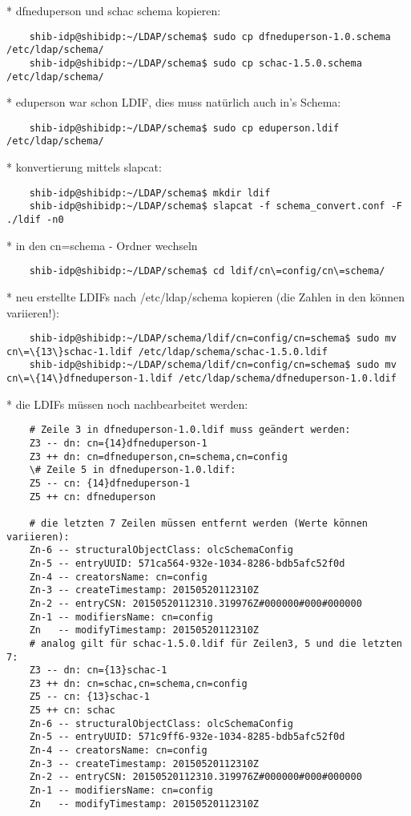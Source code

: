 * dfneduperson und schac schema kopieren:
\begin{lstlisting}
	shib-idp@shibidp:~/LDAP/schema$ sudo cp dfneduperson-1.0.schema /etc/ldap/schema/
	shib-idp@shibidp:~/LDAP/schema$ sudo cp schac-1.5.0.schema /etc/ldap/schema/
\end{lstlisting}
* eduperson war schon LDIF, dies muss natürlich auch in's Schema:
\begin{lstlisting}
	shib-idp@shibidp:~/LDAP/schema$ sudo cp eduperson.ldif /etc/ldap/schema/
\end{lstlisting}
* konvertierung mittels slapcat:
\begin{lstlisting}
	shib-idp@shibidp:~/LDAP/schema$ mkdir ldif
	shib-idp@shibidp:~/LDAP/schema$ slapcat -f schema_convert.conf -F ./ldif -n0
\end{lstlisting}
* in den cn=schema - Ordner wechseln
\begin{lstlisting}
	shib-idp@shibidp:~/LDAP/schema$ cd ldif/cn\=config/cn\=schema/
\end{lstlisting}
* neu erstellte LDIFs nach /etc/ldap/schema kopieren (die Zahlen in den {} können variieren!):
\begin{lstlisting}
	shib-idp@shibidp:~/LDAP/schema/ldif/cn=config/cn=schema$ sudo mv cn\=\{13\}schac-1.ldif /etc/ldap/schema/schac-1.5.0.ldif
	shib-idp@shibidp:~/LDAP/schema/ldif/cn=config/cn=schema$ sudo mv cn\=\{14\}dfneduperson-1.ldif /etc/ldap/schema/dfneduperson-1.0.ldif
\end{lstlisting}
* die LDIFs müssen noch nachbearbeitet werden:
\begin{lstlisting}
	# Zeile 3 in dfneduperson-1.0.ldif muss geändert werden:
	Z3 -- dn: cn={14}dfneduperson-1
	Z3 ++ dn: cn=dfneduperson,cn=schema,cn=config
	\# Zeile 5 in dfneduperson-1.0.ldif:
	Z5 -- cn: {14}dfneduperson-1
	Z5 ++ cn: dfneduperson

	# die letzten 7 Zeilen müssen entfernt werden (Werte können variieren):
	Zn-6 -- structuralObjectClass: olcSchemaConfig
	Zn-5 -- entryUUID: 571ca564-932e-1034-8286-bdb5afc52f0d
	Zn-4 -- creatorsName: cn=config
	Zn-3 -- createTimestamp: 20150520112310Z
	Zn-2 -- entryCSN: 20150520112310.319976Z#000000#000#000000
	Zn-1 -- modifiersName: cn=config
	Zn   -- modifyTimestamp: 20150520112310Z
	# analog gilt für schac-1.5.0.ldif für Zeilen3, 5 und die letzten 7:
	Z3 -- dn: cn={13}schac-1
	Z3 ++ dn: cn=schac,cn=schema,cn=config
	Z5 -- cn: {13}schac-1
	Z5 ++ cn: schac
	Zn-6 -- structuralObjectClass: olcSchemaConfig
	Zn-5 -- entryUUID: 571c9ff6-932e-1034-8285-bdb5afc52f0d
	Zn-4 -- creatorsName: cn=config
	Zn-3 -- createTimestamp: 20150520112310Z
	Zn-2 -- entryCSN: 20150520112310.319976Z#000000#000#000000
	Zn-1 -- modifiersName: cn=config
	Zn   -- modifyTimestamp: 20150520112310Z
\end{lstlisting}
